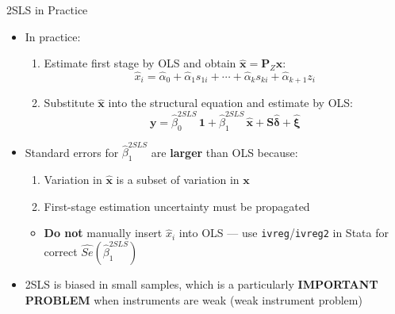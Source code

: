 \documentclass[9pt]{beamer}
\begin{document}
\begin{frame}{2SLS in Practice}
  \begin{itemize}
    \item In practice:
    \begin{enumerate}
      \item Estimate first stage by OLS and obtain $\hat{\mathbf{x}} = \mathbf{P}_Z\mathbf{x}$:
      \[
        \hat{x}_i = \hat{\alpha}_0 + \hat{\alpha}_1 s_{1i} + \cdots + \hat{\alpha}_k s_{ki} + \hat{\alpha}_{k+1} z_i
      \]
      \item Substitute $\hat{\mathbf{x}}$ into the structural equation and estimate by OLS:
      \[
        \mathbf{y} = \hat{\beta}_0^{2SLS}\,\mathbf{1} + \hat{\beta}_1^{2SLS}\,\hat{\mathbf{x}}
                   + \mathbf{S}\hat{\bm{\delta}} + \hat{\bm{\xi}}
      \]
    \end{enumerate}
    \medskip
    \item Standard errors for $\hat{\beta}_1^{2SLS}$ are \textbf{larger} than OLS because:
    \begin{enumerate}
      \item Variation in $\hat{\mathbf{x}}$ is a subset of variation in $\mathbf{x}$
      \item First-stage estimation uncertainty must be propagated
    \end{enumerate}
    \begin{itemize}
      \item[$\blacktriangleright$] \textbf{Do not} manually insert $\hat{x}_i$ into OLS --- use \texttt{ivreg}/\texttt{ivreg2} in Stata for correct $\widehat{Se}(\hat{\beta}_1^{2SLS})$
    \end{itemize}
    \medskip
    \item \alert{2SLS is biased in small samples}, which is a particularly \textbf{IMPORTANT PROBLEM} when instruments are weak (\textcolor{slideblue}{weak instrument problem})
  \end{itemize}
\end{frame}
\end{document}
